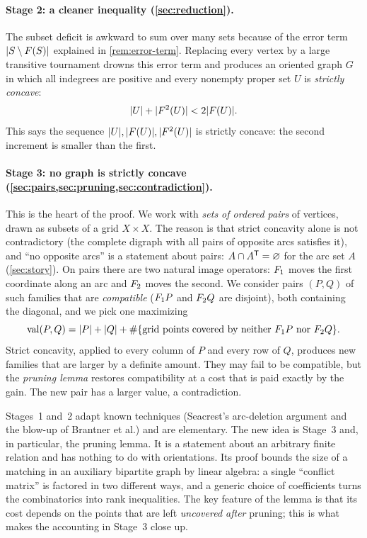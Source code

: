 \paragraph{Stage 2: a cleaner inequality (\cref{sec:reduction}).}
The subset deficit is awkward to sum over many sets because of the error
term $\lvert S\setminus F(S)\rvert$ explained in \cref{rem:error-term}. Replacing
every vertex by a large transitive tournament drowns this error term and
produces an oriented graph $G$ in which all indegrees are positive and every
nonempty proper set $U$ is \emph{strictly concave}:
\[
 \lvert U\rvert+\lvert F^2(U)\rvert<2\lvert F(U)\rvert.
\]
This says the sequence $\lvert U\rvert,\lvert F(U)\rvert,\lvert F^2(U)\rvert$ is strictly concave:
the second increment is smaller than the first.

\paragraph{Stage 3: no graph is strictly concave
(\cref{sec:pairs,sec:pruning,sec:contradiction}).}
This is the heart of the proof. We work with \emph{sets of ordered pairs}
of vertices, drawn as subsets of a grid $X\times X$. The reason is that
strict concavity alone is not contradictory (the complete digraph with all
pairs of opposite arcs satisfies it), and ``no opposite arcs'' is a
statement about pairs: $A\cap A^{\mathsf T}=\varnothing$ for the arc set $A$
(\cref{sec:story}). On pairs there are two
natural image operators: $F_1$ moves the first coordinate along an arc and
$F_2$ moves the second. We consider pairs $(P,Q)$ of such families that are
\emph{compatible} ($F_1 P$ and $F_2 Q$ are disjoint), both containing the
diagonal, and we pick one maximizing
\[
 \operatorname{val}(P,Q)=\lvert P\rvert+\lvert Q\rvert+\#\{\text{grid points covered by neither }F_1 P\text{ nor }F_2 Q\}.
\]
Strict concavity, applied to every column of $P$ and every row of $Q$,
produces new families that are larger by a definite amount. They may fail to
be compatible, but the \emph{pruning lemma} restores compatibility at a cost
that is paid exactly by the gain. The new pair has a larger value, a
contradiction.

\begin{idea}
Stages~1 and~2 adapt known techniques (Seacrest's arc-deletion argument and
the blow-up of Brantner et al.) and are elementary. The new idea is
Stage~3 and, in particular, the pruning lemma. It is a statement about an
arbitrary finite relation and has nothing to do with orientations. Its proof
bounds the size of a matching in an auxiliary bipartite graph by linear
algebra: a single ``conflict matrix'' is factored in two different ways, and
a generic choice of coefficients turns the combinatorics into rank
inequalities. The key feature of the lemma is that its cost depends on the
points that are left \emph{uncovered after} pruning; this is what makes
the accounting in Stage~3 close up.
\end{idea}

